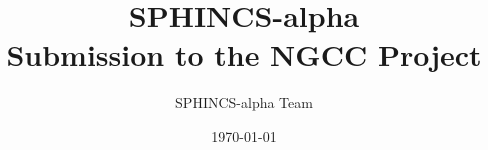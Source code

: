 \documentclass[sigconf,anonymous]{paper/build/acmart}
\begin{document}
\fancyhead{}
\def\thetitle{SPHINCS-alpha \\ Submission to the NGCC Project}
\title{\thetitle}
\date{\today}
\author{SPHINCS-alpha Team}

\maketitle



\clearpage

\tableofcontents

\clearpage
















\appendix


\end{document}
